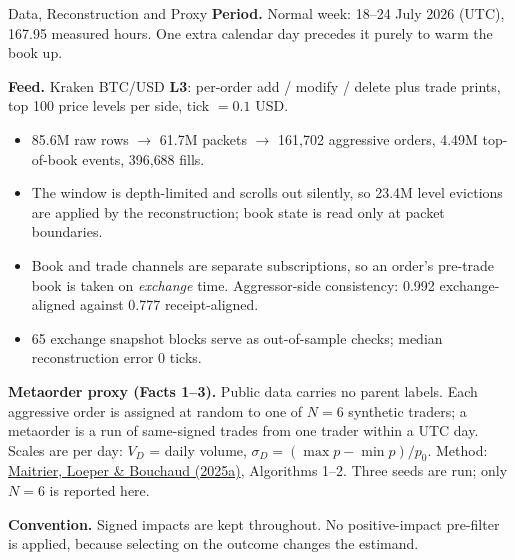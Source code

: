 \documentclass[aspectratio=169,10pt]{beamer}
\begin{document}
\begin{frame}{Data, Reconstruction and Proxy}
\footnotesize
\textbf{Period.} Normal week: 18--24 July 2026 (UTC), 167.95 measured hours. One extra calendar
day precedes it purely to warm the book up.

\medskip
\textbf{Feed.} Kraken BTC/USD \textbf{L3}: per-order add / modify / delete plus trade prints, top
100 price levels per side, tick $=0.1$ USD.
\begin{itemize}\itemsep1pt
  \item 85.6M raw rows $\rightarrow$ 61.7M packets $\rightarrow$ 161{,}702 aggressive orders,
        4.49M top-of-book events, 396{,}688 fills.
  \item The window is depth-limited and scrolls out silently, so 23.4M level evictions are applied
        by the reconstruction; book state is read only at packet boundaries.
  \item Book and trade channels are separate subscriptions, so an order's pre-trade book is taken
        on \emph{exchange} time. Aggressor-side consistency: 0.992 exchange-aligned against 0.777
        receipt-aligned.
  \item 65 exchange snapshot blocks serve as out-of-sample checks; median reconstruction error
        0 ticks.
\end{itemize}

\medskip
\textbf{Metaorder proxy (Facts 1--3).} Public data carries no parent labels. Each aggressive order
is assigned at random to one of $N=6$ synthetic traders; a metaorder is a run of same-signed trades
from one trader within a UTC day. Scales are per day: $V_D$ = daily volume,
$\sigma_D=(\max p-\min p)/p_0$.
Method: \href{https://arxiv.org/abs/2503.18199}{Maitrier, Loeper \& Bouchaud (2025a)}, Algorithms
1--2. Three seeds are run; only $N=6$ is reported here.

\medskip
\textbf{Convention.} Signed impacts are kept throughout. No positive-impact pre-filter is applied,
because selecting on the outcome changes the estimand.
\end{frame}
\end{document}
